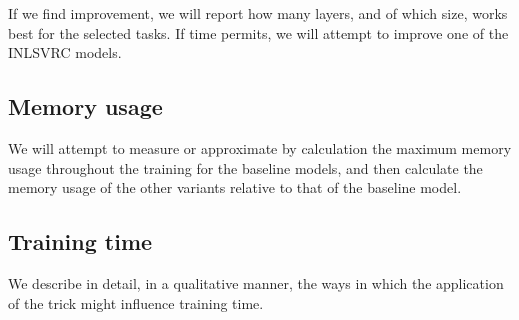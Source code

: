 \documentclass[]{article}
\begin{document}
\begin{multicols}{2}
	If we find improvement, we will report how many layers, and of which size, works best for the selected tasks. If time permits, we will attempt to improve one of the INLSVRC models.
	
	\subsection{Memory usage}
	We will attempt to measure or approximate by calculation the maximum memory usage throughout the training for the baseline models, and then calculate the memory usage of the other variants relative to that of the baseline model.
	
	\subsection{Training time}
	We describe in detail, in a qualitative manner, the ways in which the application of the trick might influence training time.
	
	
	
\end{multicols}
\end{document}
